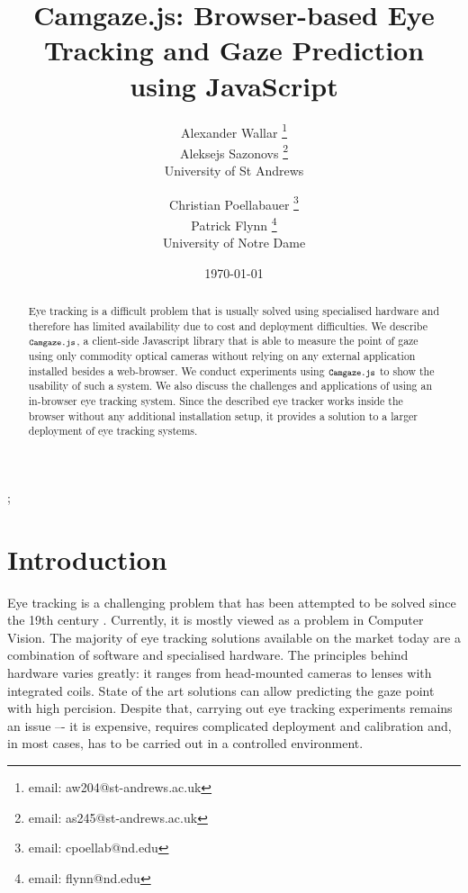 \documentclass[annual]{acmsiggraph}
\title{Camgaze.js: Browser-based Eye Tracking and Gaze Prediction using
JavaScript}
\author{Alexander Wallar \thanks{email: aw204@st-andrews.ac.uk} \\ Aleksejs
Sazonovs \thanks{email: as245@st-andrews.ac.uk} \\ University of St Andrews
\and Christian Poellabauer \thanks{email: cpoellab@nd.edu} \\ Patrick Flynn
\thanks{email: flynn@nd.edu} \\ University of Notre Dame}
\date{\today}
\newcommand{\Acronym}[1]{\ensuremath{{\small{\texttt{#1}}}}}
\newcommand{\Name}{\Acronym{Camgaze.js}} \newcommand{\False}{\Constant{false}}
\newcommand{\Constant}[1]{\ensuremath{\small{\texttt{#1}}}}
\begin{document}
\maketitle

\begin{abstract}

Eye tracking is a difficult problem that is usually solved using specialised
hardware and therefore has limited availability due to cost and deployment
difficulties. We describe $\Name$, a client-side Javascript library that is
able to measure the point of gaze using only commodity optical cameras without
relying on any external application installed besides a web-browser. We conduct
experiments using $\Name$ to show the usability of such a system.  We also
discuss the challenges and applications of using an in-browser eye tracking
system. Since the described eye tracker works inside the browser without any
additional installation setup, it provides a solution to a larger deployment of
eye tracking systems.

\end{abstract}

\begin{CRcatlist} ;

\end{CRcatlist}

\keywordlist


\copyrightspace

\section{Introduction}

Eye tracking is a challenging problem that has been attempted to be solved
since the 19th century \cite{Wade2010}. Currently, it is mostly viewed as a
problem in Computer Vision. The majority of eye tracking solutions available on
the market today are a combination of software and specialised hardware. The
principles behind hardware varies greatly: it ranges from head-mounted cameras
to lenses with integrated coils. State of the art solutions can allow
predicting the gaze point with high percision. Despite that, carrying out eye
tracking experiments remains an issue –- it is expensive, requires complicated
deployment and calibration and, in most cases, has to be carried out in a
controlled environment.
\end{document}
